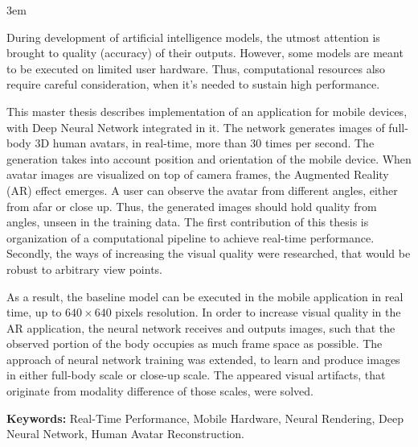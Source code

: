 \emergencystretch 3em

\par
During development of artificial intelligence models, the utmost attention is brought to quality (accuracy) of their outputs. However, some models are meant to be executed on limited user hardware. Thus, computational resources also require careful consideration, when it's needed to sustain high performance.

\par
This master thesis describes implementation of an application for mobile devices, with Deep Neural Network integrated in it. The network generates images of full-body 3D human avatars, in real-time, more than 30 times per second. The generation takes into account position and orientation of the mobile device. When avatar images are visualized on top of camera frames, the Augmented Reality (AR) effect emerges. A user can observe the avatar from different angles, either from afar or close up. Thus, the generated images should hold quality from angles, unseen in the training data. The first contribution of this thesis is organization of a computational pipeline to achieve real-time performance. Secondly, the ways of increasing the visual quality were researched, that would be robust to arbitrary view points.

\par
As a result, the baseline model \alert{\cite{stylepeople}} can be executed in the mobile application in real time, up to $640\times640$ pixels resolution. In order to increase visual quality in the AR application, the neural network receives and outputs images, such that the observed portion of the body occupies as much frame space as possible. The approach of neural network training was extended, to learn and produce images in either full-body scale or close-up scale. The appeared visual artifacts, that originate from modality difference of those scales, were solved. 

\par
\textbf{Keywords:} Real-Time Performance, Mobile Hardware, Neural Rendering, Deep Neural Network, Human Avatar Reconstruction.  
